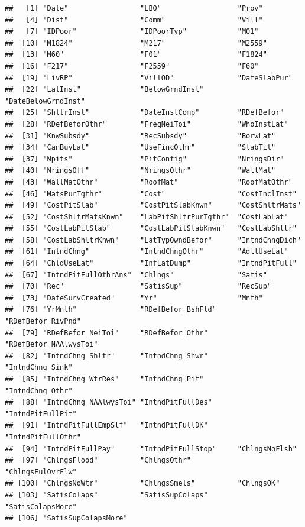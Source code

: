 \documentclass[11pt,]{article}
\begin{document}
\begin{verbatim}
##   [1] "Date"                 "LBO"                  "Prov"                
##   [4] "Dist"                 "Comm"                 "Vill"                
##   [7] "IDPoor"               "IDPoorTyp"            "M01"                 
##  [10] "M1824"                "M217"                 "M2559"               
##  [13] "M60"                  "F01"                  "F1824"               
##  [16] "F217"                 "F2559"                "F60"                 
##  [19] "LivRP"                "VillOD"               "DateSlabPur"         
##  [22] "LatInst"              "BelowGrndInst"        "DateBelowGrndInst"   
##  [25] "ShltrInst"            "DateInstComp"         "RDefBefor"           
##  [28] "RDefBeforOthr"        "FreqNeiToi"           "WhoInstLat"          
##  [31] "KnwSubsdy"            "RecSubsdy"            "BorwLat"             
##  [34] "CanBuyLat"            "UseFincOthr"          "SlabTil"             
##  [37] "Npits"                "PitConfig"            "NringsDir"           
##  [40] "NringsOff"            "NringsOthr"           "WallMat"             
##  [43] "WallMatOthr"          "RoofMat"              "RoofMatOthr"         
##  [46] "MatsPurTgthr"         "Cost"                 "CostInclInst"        
##  [49] "CostPitSlab"          "CostPitSlabKnwn"      "CostShltrMats"       
##  [52] "CostShltrMatsKnwn"    "LabPitShltrPurTgthr"  "CostLabLat"          
##  [55] "CostLabPitSlab"       "CostLabPitSlabKnwn"   "CostLabShltr"        
##  [58] "CostLabShltrKnwn"     "LatTypOwndBefor"      "IntndChngDich"       
##  [61] "IntndChng"            "IntndChngOthr"        "AdltUseLat"          
##  [64] "ChldUseLat"           "InfLatDump"           "IntndPitFull"        
##  [67] "IntndPitFullOthrAns"  "Chlngs"               "Satis"               
##  [70] "Rec"                  "SatisSup"             "RecSup"              
##  [73] "DateSurvCreated"      "Yr"                   "Mnth"                
##  [76] "YrMnth"               "RDefBefor_BshFld"     "RDefBefor_RivPnd"    
##  [79] "RDefBefor_NeiToi"     "RDefBefor_Othr"       "RDefBefor_NAAlwysToi"
##  [82] "IntndChng_Shltr"      "IntndChng_Shwr"       "IntndChng_Sink"      
##  [85] "IntndChng_WtrRes"     "IntndChng_Pit"        "IntndChng_Othr"      
##  [88] "IntndChng_NAAlwysToi" "IntndPitFullDes"      "IntndPitFullPit"     
##  [91] "IntndPitFullEmpSlf"   "IntndPitFullDK"       "IntndPitFullOthr"    
##  [94] "IntndPitFullPay"      "IntndPitFullStop"     "ChlngsNoFlsh"        
##  [97] "ChlngsFlood"          "ChlngsOthr"           "ChlngsFulOvrFlw"     
## [100] "ChlngsNoWtr"          "ChlngsSmels"          "ChlngsOK"            
## [103] "SatisColaps"          "SatisSupColaps"       "SatisColapsMore"     
## [106] "SatisSupColapsMore"
\end{verbatim}
\end{document}
